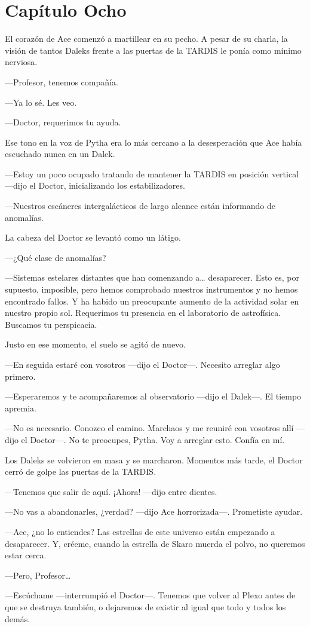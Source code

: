 \chapter*{Capítulo Ocho}

El corazón de Ace comenzó a martillear en su pecho. A pesar de
su charla, la visión de tantos Daleks frente a las puertas de la TARDIS
le ponía como mínimo nerviosa.

---Profesor, tenemos compañía.

---Ya lo sé. Les veo.

---Doctor, requerimos tu ayuda.

Ese tono en la voz de Pytha era lo más cercano a la
desesperación que Ace había escuchado nunca en un Dalek.

---Estoy un poco ocupado tratando de mantener la TARDIS en
posición vertical ---dijo el Doctor, inicializando los estabilizadores.

---Nuestros escáneres intergalácticos de largo alcance están
informando de anomalías.

La cabeza del Doctor se levantó como un látigo.

---¿Qué clase de anomalías?

---Sistemas estelares distantes que han comenzando a\ldots{}
desaparecer. Esto es, por supuesto, imposible, pero hemos comprobado
nuestros instrumentos y no hemos encontrado fallos. Y ha habido un
preocupante aumento de la actividad solar en nuestro propio sol.
Requerimos tu presencia en el laboratorio de astrofísica. Buscamos tu
perspicacia.

Justo en ese momento, el suelo se agitó de nuevo.

---En seguida estaré con vosotros ---dijo el Doctor---. Necesito
arreglar algo primero.

---Esperaremos y te acompañaremos al observatorio ---dijo el
Dalek---. El tiempo apremia.

---No es necesario. Conozco el camino. Marchaos y me reuniré con
vosotros allí ---dijo el Doctor---. No te preocupes, Pytha. Voy a
arreglar esto. Confía en mí.

Los Daleks se volvieron en masa y se marcharon. Momentos más
tarde, el Doctor cerró de golpe las puertas de la TARDIS.

---Tenemos que salir de aquí. ¡Ahora! ---dijo entre dientes.

---No vas a abandonarles, ¿verdad? ---dijo Ace horrorizada---.
Prometiste ayudar.

---Ace, ¿no lo entiendes? Las estrellas de este universo están
empezando a desaparecer. Y, créeme, cuando la estrella de Skaro muerda
el polvo, no queremos estar cerca.

---Pero, Profesor\ldots{}

---Escúchame ---interrumpió el Doctor---. Tenemos que volver al
Plexo antes de que se destruya también, o dejaremos de existir al igual
que todo y todos los demás.
